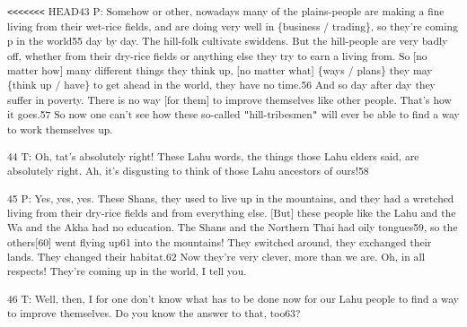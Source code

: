 \textsuperscript{\texttt{<}\texttt{<}\texttt{<}\texttt{<}\texttt{<}\texttt{<}\texttt{<}
HEAD43 P: Somehow or other, nowadays many of the plains-people are making a fine
living from their wet-rice fields, and are doing very well in \{business / trading\},
so they're coming p in the world55 day by day. The hill-folk cultivate swiddens.
But the hill-people are very badly off, whether from their dry-rice fields or anything
else they try to earn a living from. So [no matter how] many different things they
think up, [no matter what] \{ways / plans\} they may \{think up / have\} to get
ahead in the world, they have no time.56 And so day after day they suffer in poverty.
There is no way [for them] to improve themselves like other people. That's how
it goes.57 So now one can't see how these so-called \texttt{"}hill-tribesmen\texttt{"}
will ever be able to find a way to work themselves up. }

\textsuperscript{44 T: Oh, tat's absolutely right! These Lahu words, the things
those Lahu elders said, are absolutely right. Ah, it's disgusting to think of those
Lahu ancestors of ours!58}

\textsuperscript{45 P: Yes, yes, yes. These Shans, they used to live up in the
mountains, and they had a wretched living from their dry-rice fields and from everything
else. [But] these people like the Lahu and the Wa and the Akha had no education.
The Shans and the Northern Thai had oily tongues59, so the others[60] went flying
up61 into the mountains! They switched around, they exchanged their lands. They
changed their habitat.62 Now they're very clever, more than we are. Oh, in all
respects! They're coming up in the world, I tell you.}

\textsuperscript{46 T: Well, then, I for one don't know what has to be done now
for our Lahu people to find a way to improve themselves. Do you know the answer
to that, too63?}

